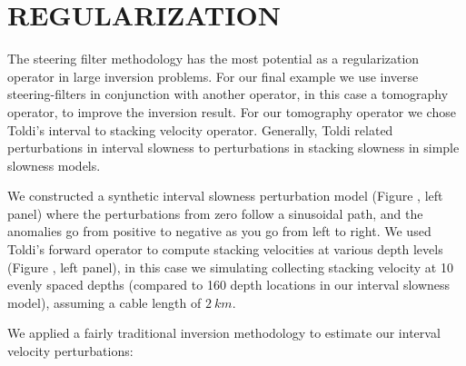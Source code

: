 
\section{REGULARIZATION}
The steering filter methodology has the most potential as a regularization 
operator in large inversion problems. For our final example
we use inverse steering-filters in conjunction with another
operator, in this case a tomography operator, to improve the 
inversion result.
For our tomography operator we chose Toldi's 
interval to stacking velocity operator\cite{Toldi.sep.43}. 
Generally, Toldi related perturbations in 
interval slowness
to perturbations in stacking slowness 
in  simple  slowness models.  
\par
We constructed a synthetic interval slowness perturbation model (Figure 
,  left panel) where the perturbations from zero follow a 
sinusoidal path, and the anomalies go from positive to negative as you go
from left to right.  
We  used Toldi's forward operator to compute
stacking velocities at various depth levels (Figure , 
left panel), in this case we simulating collecting stacking velocity at 10
evenly spaced depths (compared to 160 depth locations in our interval
slowness model), assuming a cable length of $2~km$.


\par
We applied a fairly traditional inversion methodology to estimate 
our interval velocity perturbations:

